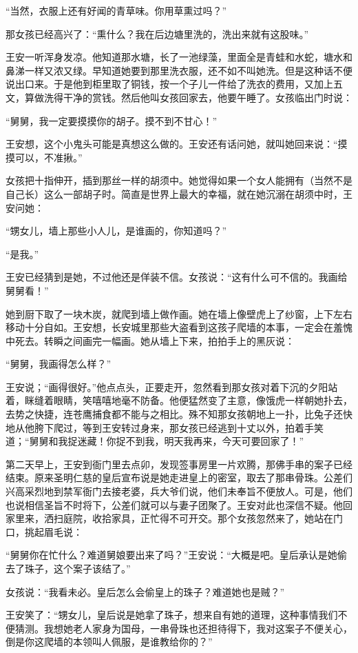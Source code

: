 “当然，衣服上还有好闻的青草味。你用草熏过吗？” 

那女孩已经高兴了：“熏什么？我在后边塘里洗的，洗出来就有这股味。” 

王安一听浑身发凉。他知道那水塘，长了一池绿藻，里面全是青蛙和水蛇，塘水和鼻涕一样又浓又绿。早知道她要到那里洗衣服，还不如不叫她洗。但是这种话不便说出口来。于是他到柜里取了铜钱，按一个子儿一件给了洗衣的费用，又加上五文，算做洗得干净的赏钱。然后他叫女孩回家去，他要午睡了。女孩临出门时说： 

“舅舅，我一定要摸摸你的胡子。摸不到不甘心！” 

王安想，这个小鬼头可能是真想这么做的。王安还有话问她，就叫她回来说：“摸摸可以，不准揪。” 

女孩把十指伸开，插到那丝一样的胡须中。她觉得如果一个女人能拥有（当然不是自己长）这么一部胡子时。简直是世界上最大的幸福，就在她沉溺在胡须中时，王安问她： 

“甥女儿，墙上那些小人儿，是谁画的，你知道吗？” 

“是我。” 

王安已经猜到是她，不过他还是佯装不信。女孩说：“这有什么可不信的。我画给舅舅看！” 

她到厨下取了一块木炭，就爬到墙上做作画。她在墙上像壁虎上了纱窗，上下左右移动十分自如。王安想，长安城里那些大盗看到这孩子爬墙的本事，一定会在羞愧中死去。转瞬之间画完一幅画。她从墙上下来，拍拍手上的黑灰说： 

“舅舅，我画得怎么样？” 

王安说；“画得很好。”他点点头，正要走开，忽然看到那女孩对着下沉的夕阳站着，眯缝着眼睛，笑嘻嘻地毫不防备。他便猛然变了主意，像饿虎一样朝她扑去，去势之快捷，连苍鹰捕食都不能与之相比。殊不知那女孩朝地上一扑，比兔子还快地从他胯下爬过，等到王安转过身来，那女孩已经逃到十丈以外，拍着手笑道；“舅舅和我捉迷藏！你捉不到我，明天我再来，今天可要回家了！” 

第二天早上，王安到衙门里去点卯，发现签事房里一片欢腾，那佛手串的案子已经结束。原来圣明仁慈的皇后宣布说是她走进皇上的密室，取去了那串骨珠。公差们兴高采烈地到禁军衙门去接老婆，兵大爷们说，他们未奉旨不便放人。可是，他们也说相信圣旨不时将下，公差们就可以与妻子团聚了。王安对此也深信不疑。他回家里来，洒扫庭院，收拾家具，正忙得不可开交。那个女孩忽然来了，她站在门口，挑起眉毛说： 

“舅舅你在忙什么？难道舅娘要出来了吗？”王安说：“大概是吧。皇后承认是她偷去了珠子，这个案子该结了。” 

女孩说：“我看未必。皇后怎么会偷皇上的珠子？难道她也是贼？” 

王安笑了：“甥女儿，皇后说是她拿了珠子，想来自有她的道理，这种事情我们不便猜测。我想她老人家身为国母，一串骨珠也还担待得下，我对这案子不便关心，倒是你这爬墙的本领叫人佩服，是谁教给你的？” 

